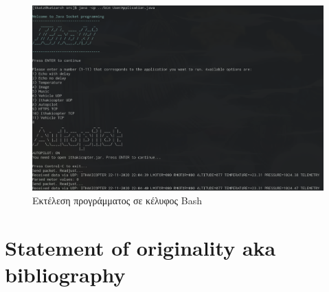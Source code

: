 \documentclass[hidelinks, 12pt, a4paper]{article}
\begin{document}
\begin{figure}[h!]
\centering
	\includegraphics[width=\textwidth]{assets/ui.png}
	\caption{Εκτέλεση προγράμματος σε κέλυφος Bash} 
    \label{fig:ui}
\end{figure}



\section{Statement of originality aka bibliography}
 
\end{document}
